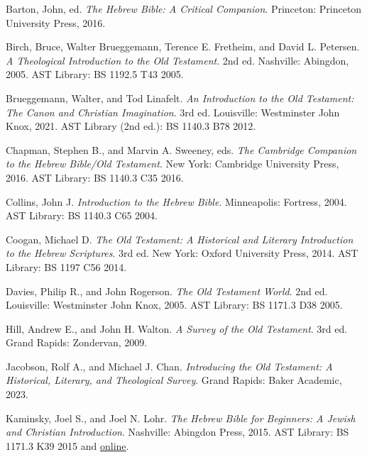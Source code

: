 \documentclass[titlepage]{article}
\begin{document}
\begingroup
\renewcommand{\section}[2]{}%
\begin{thebibliography}{99}%

	 Barton, John, ed.
	\emph{The Hebrew Bible: A Critical Companion}.
	Princeton: Princeton University Press, 2016.

	 Birch, Bruce, Walter Brueggemann, Terence E. Fretheim, and David L. Petersen.
	\emph{A Theological Introduction to the Old Testament}.
	2nd ed. Nashville: Abingdon, 2005.
	AST Library: BS 1192.5 T43 2005.

	 Brueggemann, Walter, and Tod Linafelt.
	\emph{An Introduction to the Old Testament: The Canon and Christian Imagination}.
	3rd ed. Louisville: Westminster John Knox, 2021.
	AST Library (2nd ed.): BS 1140.3 B78 2012.

	 Chapman, Stephen B., and Marvin A. Sweeney, eds.
	\emph{The Cambridge Companion to the Hebrew Bible/Old Testament}.
	New York: Cambridge University Press, 2016.
	AST Library: BS 1140.3 C35 2016.

	 Collins, John J.
	\emph{Introduction to the Hebrew Bible}.
	Minneapolis: Fortress, 2004.
	AST Library: BS 1140.3 C65 2004.

	 Coogan, Michael D.
	\emph{The Old Testament: A Historical and Literary Introduction to the Hebrew Scriptures}.
	3rd ed. New York: Oxford University Press, 2014.
	AST Library: BS 1197 C56 2014.

	 Davies, Philip R., and John Rogerson.
	\emph{The Old Testament World}.
	2nd ed. Louisville: Westminster John Knox, 2005.
	AST Library: BS 1171.3 D38 2005.

	 Hill, Andrew E., and John H. Walton.
	\emph{A Survey of the Old Testament}.
	3rd ed. Grand Rapids: Zondervan, 2009.

	 Jacobson, Rolf A., and Michael J. Chan.
	\emph{Introducing the Old Testament: A Historical, Literary, and Theological Survey}.
	Grand Rapids: Baker Academic, 2023.

	 Kaminsky, Joel S., and Joel N. Lohr.
	\emph{The Hebrew Bible for Beginners: A Jewish and Christian Introduction}.
	Nashville: Abingdon Press, 2015.
	AST Library: BS 1171.3 K39 2015 and \href{https://search.ebscohost.com/login.aspx?direct=true&AuthType=cookie,ip,shib&db=nlebk&AN=969753&site=ehost-live&scope=site&custid=s5315951}{online}.


\end{thebibliography}
\end{document}
